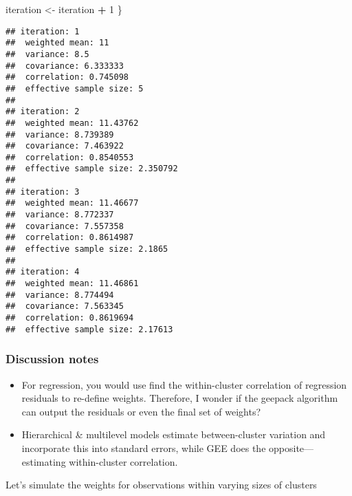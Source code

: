 \documentclass[
]{article}
\newenvironment{Shaded}{\begin{snugshade}}{\end{snugshade}}
\newcommand{\DecValTok}[1]{\textcolor[rgb]{0.00,0.00,0.81}{#1}}
\newcommand{\NormalTok}[1]{#1}
\newcommand{\OtherTok}[1]{\textcolor[rgb]{0.56,0.35,0.01}{#1}}
\newcommand{\SpecialCharTok}[1]{\textcolor[rgb]{0.81,0.36,0.00}{\textbf{#1}}}
\providecommand{\tightlist}{%
  \setlength{\itemsep}{0pt}\setlength{\parskip}{0pt}}
\begin{document}
\begin{Shaded}
\begin{Highlighting}[]
\NormalTok{  iteration }\OtherTok{\textless{}{-}}\NormalTok{ iteration }\SpecialCharTok{+} \DecValTok{1}
\NormalTok{\}}
\end{Highlighting}
\end{Shaded}

\begin{verbatim}
## iteration: 1 
##  weighted mean: 11 
##  variance: 8.5 
##  covariance: 6.333333 
##  correlation: 0.745098 
##  effective sample size: 5 
## 
## iteration: 2 
##  weighted mean: 11.43762 
##  variance: 8.739389 
##  covariance: 7.463922 
##  correlation: 0.8540553 
##  effective sample size: 2.350792 
## 
## iteration: 3 
##  weighted mean: 11.46677 
##  variance: 8.772337 
##  covariance: 7.557358 
##  correlation: 0.8614987 
##  effective sample size: 2.1865 
## 
## iteration: 4 
##  weighted mean: 11.46861 
##  variance: 8.774494 
##  covariance: 7.563345 
##  correlation: 0.8619694 
##  effective sample size: 2.17613
\end{verbatim}

\hypertarget{discussion-notes}{%
\subsubsection{Discussion notes}\label{discussion-notes}}

\begin{itemize}
\tightlist
\item
  For regression, you would use find the within-cluster correlation of
  regression residuals to re-define weights. Therefore, I wonder if the
  geepack algorithm can output the residuals or even the final set of
  weights?
\item
  Hierarchical \& multilevel models estimate between-cluster variation
  and incorporate this into standard errors, while GEE does the
  opposite---estimating within-cluster correlation.
\end{itemize}

Let's simulate the weights for observations within varying sizes of
clusters
\end{document}
